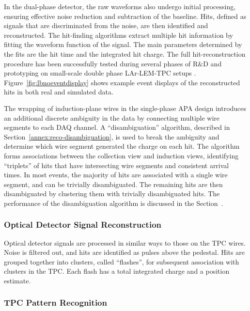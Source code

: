 In the dual-phase detector, the raw waveforms also undergo initial processing, 
ensuring effective noise reduction and subtraction of the baseline.
Hits, defined as signals that are discriminated from the noise, are then identified and reconstructed.
The hit-finding algorithms extract multiple hit information by fitting the waveform function of the signal.
The main parameters determined by the fits are the hit time and the integrated hit charge.
The full hit-reconstruction procedure has been successfully tested during several phases 
of R$\&$D and prototyping on small-scale double phase LAr-LEM-TPC setups \cite{Badertscher:2008rf,Badertscher:2012dq}.
Figure~\ref{fig:lbnoeventdisplay} shows example event displays of the reconstructed hits 
in both real and simulated data. 

The wrapping of induction-plane wires in the single-phase APA design
introduces an additional discrete ambiguity in the data by connecting multiple wire
segments to each DAQ channel. A ``disambiguation'' algorithm,
described in Section~\ref{annex:reco-disambiguation}, is used to break the
ambiguity and determine which wire segment generated the charge on each hit.
The algorithm forms associations between the collection view and induction views,
identifying ``triplets'' of hits that have intersecting wire segments
and consistent arrival times. In most events, the majority of hits are
associated with a single wire segment, and can be trivially disambiguated.
The remaining hits are then disambiguated by clustering them with trivially disambiguated hits.
The performance of the disambiguation algorithm is discussed in the Section~\cite{annex:disambiguation}.





\subsubsection{Optical Detector Signal Reconstruction}

Optical detector signals are processed in similar ways to those on the TPC wires.
Noise is filtered out, and hits are identified as pulses above the pedestal.
Hits are grouped together into clusters, called ``flashes'', for subsequent
association with clusters in the TPC.  Each flash has a total integrated charge and a position
estimate.


\subsubsection{TPC Pattern Recognition}

